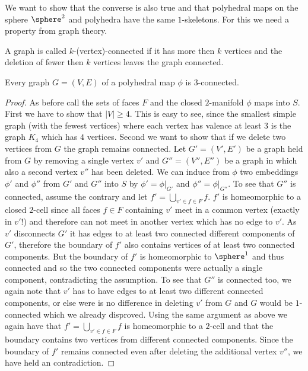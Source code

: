 We want to show that the converse is also true and that polyhedral maps on the sphere $\sphere^2$ and polyhedra have the same $1$-skeletons. For this we need a property from graph theory.

\begin{definition} A graph is called $k$-(vertex)-connected if it has more then $k$ vertices and the deletion of fewer then $k$ vertices leaves the graph connected.
\end{definition}

\begin{proposition} Every graph $G = (V, E)$ of a polyhedral map $\phi$ is $3$-connected.
  \begin{proof}
    As before call the sets of faces $F$ and the closed $2$-manifold $\phi$ maps into $S$. First we have to show that $|V| \geq 4$. This is easy to see, since the smallest simple graph (with the fewest vertices) where each vertex has valence at least $3$ is the graph $K_4$ which has $4$ vertices. Second we want to show that if we delete two vertices from $G$ the graph remains connected. Let $G' = (V', E')$ be a graph held from $G$ by removing a single vertex $v'$ and $G'' = (V'', E'')$ be a graph in which also a second vertex $v''$ has been deleted. We can induce from $\phi$ two embeddings $\phi'$ and $\phi''$ from $G'$ and $G''$ into $S$ by $\phi' = \phi|_{G'}$ and $\phi'' = \phi|_{G''}$. To see that $G''$ is connected, assume the contrary and let $f' = \bigcup_{v' \in f \in F} f$. $f'$ is homeomorphic to a closed $2$-cell since all faces $f \in F$ containing $v'$ meet in a common vertex (exactly in $v'$!) and therefore can not meet in another vertex which has no edge to $v'$. As $v'$ disconnects $G'$ it has edges to at least two connected different components of $G'$, therefore the boundary of $f'$ also contains vertices of at least two connected components. But the boundary of $f'$ is homeomorphic to $\sphere^1$ and thus connected and so the two connected components were actually a single component, contradicting the assumption. To see that $G''$ is connected too, we again note that $v'$ has to have edges to at least two different connected components, or else were is no difference in deleting $v'$ from $G$ and $G$ would be $1$-connected which we already disproved. Using the same argument as above we again have that $f' = \bigcup_{v' \in f \in F} f$ is homeomorphic to a $2$-cell and that the boundary contains two vertices from different connected components. Since the boundary of $f'$ remains connected even after deleting the additional vertex $v''$, we have held an contradiction.
  \end{proof}
\end{proposition}

